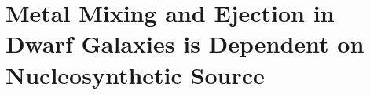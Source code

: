 \chapter[Metal Mixing and Ejection in Dwarf Galaxies is Dependent on Nucleosynthetic Source]{Metal Mixing and Ejection in Dwarf Galaxies is Dependent on Nucleosynthetic Source \label{ch:chapter3}}
\begingroup
\let\thefootnote\relax{}
\endgroup

%
%



